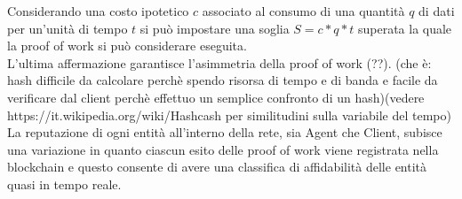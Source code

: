 	
	Considerando una costo ipotetico $c$ associato al consumo di una quantità $q$ di dati per un'unità di tempo $t$ si può impostare una soglia $S = c*q*t$ superata la quale la proof of work si può considerare eseguita.\\
	L'ultima affermazione garantisce l'asimmetria della proof of work (??). (che è: hash difficile da calcolare perchè spendo risorsa di tempo e di banda e facile da verificare dal client perchè effettuo un semplice confronto di un hash)(vedere https://it.wikipedia.org/wiki/Hashcash per similitudini sulla variabile del tempo)\\
	
	
	La reputazione di ogni entità all'interno della rete, sia Agent che Client, subisce una variazione in quanto ciascun esito delle proof of work viene registrata nella blockchain e questo consente di avere una classifica di affidabilità delle entità quasi in tempo reale.\\
	
